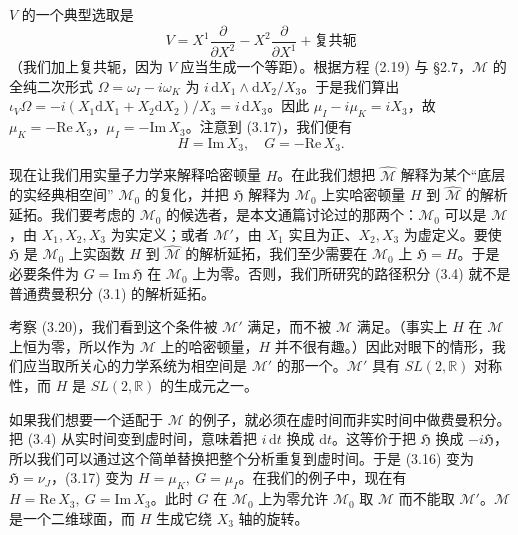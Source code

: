 \documentclass[11pt,a4paper,UTF8]{ctexart}
\theoremstyle{plain}
\theoremstyle{definition}
\begin{document}
$V$ 的一个典型选取是
\begin{equation}
    V=X^1\frac{\partial}{\partial X^2}-X^2\frac{\partial}{\partial X^1}+\text{复共轭}
    \tag{3.19}
\end{equation}
（我们加上复共轭，因为 $V$ 应当生成一个等距）。根据方程 (2.19) 与 §2.7，$\widehat{\mathcal{M}}$ 的全纯二次形式 $\Omega=\omega_I-i\omega_K$ 为 $i\,\mathrm{d}X_1\wedge\mathrm{d}X_2/X_3$。于是我们算出 $\iota_V\Omega=-i(X_1\mathrm{d}X_1+X_2\mathrm{d}X_2)/X_3=i\,\mathrm{d}X_3$。因此 $\mu_I-i\mu_K=iX_3$，故 $\mu_K=-\mathrm{Re}\,X_3$，$\mu_I=-\mathrm{Im}\,X_3$。注意到 (3.17)，我们便有
\begin{equation}
    H=\mathrm{Im}\,X_3,\quad G=-\mathrm{Re}\,X_3.
    \tag{3.20}
\end{equation}


现在让我们用实量子力学来解释哈密顿量 $H$。在此我们想把 $\widehat{\mathcal{M}}$ 解释为某个“底层的实经典相空间” $\mathcal{M}_0$ 的复化，并把 $\mathfrak{H}$ 解释为 $\mathcal{M}_0$ 上实哈密顿量 $H$ 到 $\widehat{\mathcal{M}}$ 的解析延拓。我们要考虑的 $\mathcal{M}_0$ 的候选者，是本文通篇讨论过的那两个：$\mathcal{M}_0$ 可以是 $\mathcal{M}$，由 $X_1,X_2,X_3$ 为实定义；或者 $\mathcal{M}'$，由 $X_1$ 实且为正、$X_2,X_3$ 为虚定义。要使 $\mathfrak{H}$ 是 $\mathcal{M}_0$ 上实函数 $H$ 到 $\widehat{\mathcal{M}}$ 的解析延拓，我们至少需要在 $\mathcal{M}_0$ 上 $\mathfrak{H}=H$。于是必要条件为 $G=\mathrm{Im}\,\mathfrak{H}$ 在 $\mathcal{M}_0$ 上为零。否则，我们所研究的路径积分 (3.4) 就不是普通费曼积分 (3.1) 的解析延拓。

考察 (3.20)，我们看到这个条件被 $\mathcal{M}'$ 满足，而不被 $\mathcal{M}$ 满足。（事实上 $H$ 在 $\mathcal{M}$ 上恒为零，所以作为 $\mathcal{M}$ 上的哈密顿量，$H$ 并不很有趣。）因此对眼下的情形，我们应当取所关心的力学系统为相空间是 $\mathcal{M}'$ 的那一个。$\mathcal{M}'$ 具有 $SL(2,\mathbb{R})$ 对称性，而 $H$ 是 $SL(2,\mathbb{R})$ 的生成元之一。

如果我们想要一个适配于 $\mathcal{M}$ 的例子，就必须在虚时间而非实时间中做费曼积分。把 (3.4) 从实时间变到虚时间，意味着把 $i\,\mathrm{d}t$ 换成 $\mathrm{d}t$。这等价于把 $\mathfrak{H}$ 换成 $-i\mathfrak{H}$，所以我们可以通过这个简单替换把整个分析重复到虚时间。于是 (3.16) 变为 $\mathfrak{H}=\nu_J$，(3.17) 变为 $H=\mu_K,\ G=\mu_I$。在我们的例子中，现在有 $H=\mathrm{Re}\,X_3,\ G=\mathrm{Im}\,X_3$。此时 $G$ 在 $\mathcal{M}_0$ 上为零允许 $\mathcal{M}_0$ 取 $\mathcal{M}$ 而不能取 $\mathcal{M}'$。$\mathcal{M}$ 是一个二维球面，而 $H$ 生成它绕 $X_3$ 轴的旋转。
\end{document}
